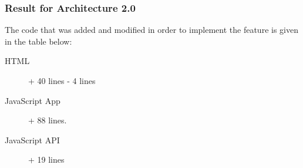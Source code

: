 %


\subsubsection{Result for Architecture 2.0}
%

The code that was added and modified in order to implement the feature is given in the table below:
\begin{description}
  \item[HTML] + 40 lines - 4 lines
  \item[JavaScript App] + 88 lines. 
  \item[JavaScript API] + 19 lines
\end{description}

